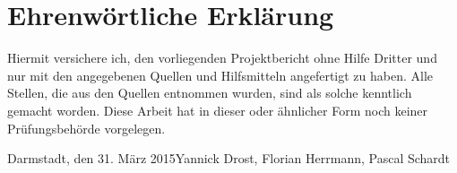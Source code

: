 \documentclass[longdoc,accentcolor=tud9b,11pt,paper=a4,ngerman]{tudreport}
\title{\komTitle}
\subtitle{\komThesisType}
\newcounter{dummy} %
\newcommand{\komThesisType}{Projektbericht\xspace} %
\newcommand{\komName}{Yannick Drost, Florian Herrmann, Pascal Schardt\xspace}
\newcommand{\komSubmissionDate}{31. M\"arz 2015\xspace}%
\begin{document}
	\frenchspacing
	\raggedbottom
	\maketitle





	\chapter*{Ehrenw\"ortliche Erkl\"arung}
	Hiermit versichere ich, den vorliegenden \komThesisType ohne Hilfe Dritter und nur mit den angegebenen Quellen 
    und Hilfsmitteln angefertigt zu haben. Alle Stellen, die aus den Quellen entnommen wurden, sind als solche 
    kenntlich gemacht worden. Diese Arbeit hat in dieser oder \"ahnlicher Form noch keiner Pr\"ufungsbeh\"orde vorgelegen.
	
	\vspace{1.5cm}
	\noindent Darmstadt, den \komSubmissionDate\hfill \komName

	\tableofcontents
	\cleardoublepage
	
	
	\listoffigures
	\listoftables
\end{document}
